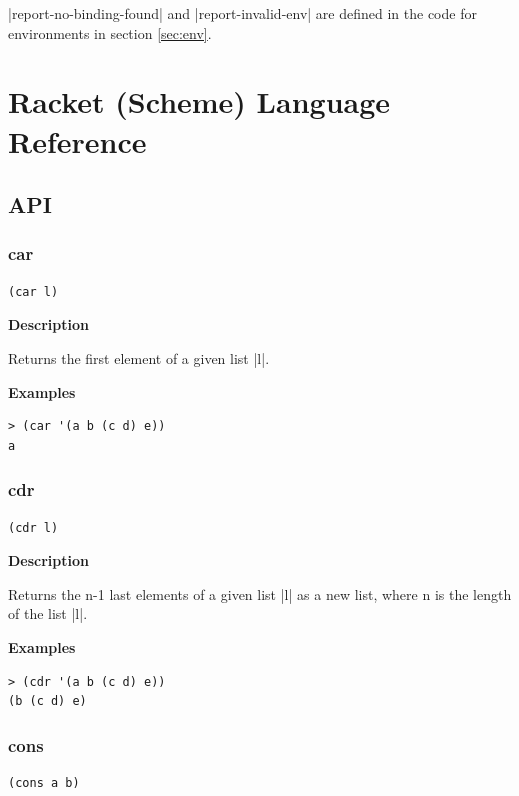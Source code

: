 \documentclass[a4paper]{article}
\begin{document}
|report-no-binding-found| and |report-invalid-env| are defined in the code for environments in section \ref{sec:env}.

\newpage

\section{Racket (Scheme) Language Reference}

\subsection{API}

\subsubsection{car}

\begin{lstlisting}[frame=none]
(car l)
\end{lstlisting}

\textbf{Description}

Returns the first element of a given list |l|.

\textbf{Examples}

\begin{lstlisting}
> (car '(a b (c d) e))
a
\end{lstlisting}

\subsubsection{cdr}

\begin{lstlisting}[frame=none]
(cdr l)
\end{lstlisting}

\textbf{Description}

Returns the n-1 last elements of a given list |l| as a new list, where n is the length of the list |l|.

\textbf{Examples}

\begin{lstlisting}
> (cdr '(a b (c d) e))
(b (c d) e)
\end{lstlisting}

\subsubsection{cons}

\begin{lstlisting}[frame=none]
(cons a b)
\end{lstlisting}
\end{document}

